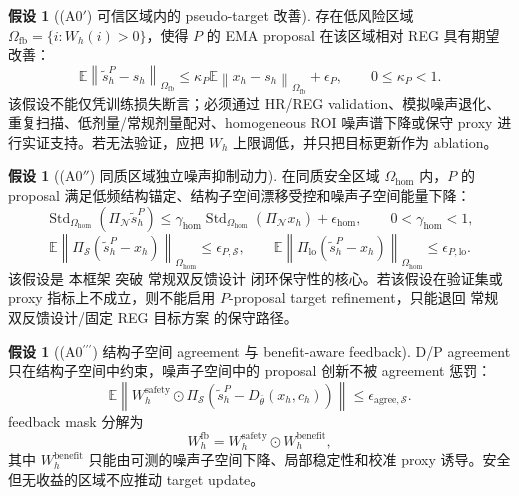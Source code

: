 \documentclass[11pt,a4paper,UTF8,fontset=fandol]{ctexart}
\theoremstyle{definition}
\newtheorem{assumption}[theorem]{假设}
\DeclareMathOperator{\Std}{Std}
\newcommand{\norm}[1]{\left\lVert#1\right\rVert}
\newcommand{\E}{\mathbb{E}}
\begin{document}
\begin{assumption}[(A0$'$) 可信区域内的 pseudo-target 改善]
存在低风险区域 $\Omega_{\mathrm{fb}}=\{i:W_h(i)>0\}$，使得 $P$ 的 EMA proposal 在该区域相对 REG 具有期望改善：
\begin{equation}
\label{eq:p-improvement-assumption-coreB}
    \E\norm{\tilde s_h^P-s_h}_{\Omega_{\mathrm{fb}}}
    \le
    \kappa_P\E\norm{x_h-s_h}_{\Omega_{\mathrm{fb}}}+\epsilon_P,
    \qquad 0\le\kappa_P<1.
\end{equation}
该假设不能仅凭训练损失断言；必须通过 HR/REG validation、模拟噪声退化、重复扫描、低剂量/常规剂量配对、homogeneous ROI 噪声谱下降或保守 proxy 进行实证支持。若无法验证，应把 $W_h$ 上限调低，并只把目标更新作为 ablation。
\end{assumption}





\begin{assumption}[(A0$''$) 同质区域独立噪声抑制动力]
在同质安全区域 $\Omega_{\mathrm{hom}}$ 内，$P$ 的 proposal 满足低频结构锚定、结构子空间漂移受控和噪声子空间能量下降：
\begin{equation}
\label{eq:a0pp-hom-coreC}
    \Std_{\Omega_{\mathrm{hom}}}(\Pi_{\mathcal N}\tilde s_h^P)
    \le
    \gamma_{\mathrm{hom}}
    \Std_{\Omega_{\mathrm{hom}}}(\Pi_{\mathcal N}x_h)+\epsilon_{\mathrm{hom}},
    \qquad 0<\gamma_{\mathrm{hom}}<1,
\end{equation}
\begin{equation}
\label{eq:a0pp-struct-coreC}
    \E\norm{\Pi_{\mathcal S}(\tilde s_h^P-x_h)}_{\Omega_{\mathrm{hom}}}
    \le \epsilon_{P,\mathcal S},
    \qquad
    \E\norm{\Pi_{\mathrm{lo}}(\tilde s_h^P-x_h)}_{\Omega_{\mathrm{hom}}}
    \le \epsilon_{P,\mathrm{lo}}.
\end{equation}
该假设是 本框架 突破 常规双反馈设计 闭环保守性的核心。若该假设在验证集或 proxy 指标上不成立，则不能启用 $P$-proposal target refinement，只能退回 常规双反馈设计/固定 REG 目标方案 的保守路径。
\end{assumption}

\begin{assumption}[(A0$^{\prime\prime\prime}$) 结构子空间 agreement 与 benefit-aware feedback]
D/P agreement 只在结构子空间中约束，噪声子空间中的 proposal 创新不被 agreement 惩罚：
\begin{equation}
    \E\norm{W_h^{\mathrm{safety}}\odot\Pi_{\mathcal S}(\tilde s_h^P-D_{\bar\theta}(x_h,c_h))}\le\epsilon_{\mathrm{agree},\mathcal S}.
\end{equation}
feedback mask 分解为
\begin{equation}
    W_h^{\mathrm{fb}}=W_h^{\mathrm{safety}}\odot W_h^{\mathrm{benefit}},
\end{equation}
其中 $W_h^{\mathrm{benefit}}$ 只能由可测的噪声子空间下降、局部稳定性和校准 proxy 诱导。安全但无收益的区域不应推动 target update。
\end{assumption}
\end{document}
